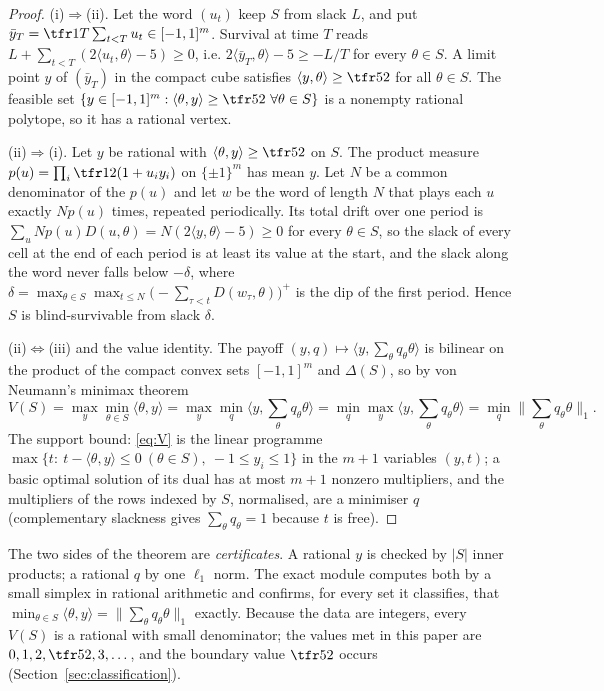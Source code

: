 \begin{proof}
(i)$\Rightarrow$(ii). Let the word $(u_t)$ keep $S$ from slack $L$, and put $\bar y_T=\tfr1T\sum_{t<T}u_t\in[-1,1]^m$. Survival at time $T$ reads $L+\sum_{t<T}(2\langle u_t,\theta\rangle-5)\ge0$, i.e. $2\langle\bar y_T,\theta\rangle-5\ge-L/T$ for every $\theta\in S$. A limit point $y$ of $(\bar y_T)$ in the compact cube satisfies $\langle y,\theta\rangle\ge\tfr52$ for all $\theta\in S$. The feasible set $\{y\in[-1,1]^m:\langle\theta,y\rangle\ge\tfr52\ \forall\theta\in S\}$ is a nonempty rational polytope, so it has a rational vertex.

(ii)$\Rightarrow$(i). Let $y$ be rational with $\langle\theta,y\rangle\ge\tfr52$ on $S$. The product measure $p(u)=\prod_{i}\tfr12(1+u_iy_i)$ on $\{\pm1\}^m$ has mean $y$. Let $N$ be a common denominator of the $p(u)$ and let $w$ be the word of length $N$ that plays each $u$ exactly $Np(u)$ times, repeated periodically. Its total drift over one period is $\sum_uNp(u)D(u,\theta)=N(2\langle y,\theta\rangle-5)\ge0$ for every $\theta\in S$, so the slack of every cell at the end of each period is at least its value at the start, and the slack along the word never falls below $-\delta$, where $\delta=\max_{\theta\in S}\max_{t\le N}\big(-\sum_{\tau<t}D(w_\tau,\theta)\big)^+$ is the dip of the first period. Hence $S$ is blind-survivable from slack $\delta$.

(ii)$\Leftrightarrow$(iii) and the value identity. The payoff $(y,q)\mapsto\langle y,\sum_\theta q_\theta\theta\rangle$ is bilinear on the product of the compact convex sets $[-1,1]^m$ and $\Delta(S)$, so by von Neumann's minimax theorem \cite{vonNeumann1928}
\[V(S)=\max_y\min_{\theta\in S}\langle\theta,y\rangle=\max_y\min_q\Big\langle y,\sum_\theta q_\theta\theta\Big\rangle=\min_q\max_y\Big\langle y,\sum_\theta q_\theta\theta\Big\rangle=\min_q\Big\|\sum_\theta q_\theta\theta\Big\|_1 .\]
The support bound: \eqref{eq:V} is the linear programme $\max\{t:\ t-\langle\theta,y\rangle\le0\ (\theta\in S),\ -1\le y_i\le1\}$ in the $m+1$ variables $(y,t)$; a basic optimal solution of its dual has at most $m+1$ nonzero multipliers, and the multipliers of the rows indexed by $S$, normalised, are a minimiser $q$ (complementary slackness gives $\sum_\theta q_\theta=1$ because $t$ is free).
\end{proof}

The two sides of the theorem are \emph{certificates}. A rational $y$ is checked by $|S|$ inner products; a rational $q$ by one $\ell_1$ norm. The exact module computes both by a small simplex in rational arithmetic and confirms, for every set it classifies, that $\min_{\theta\in S}\langle\theta,y\rangle=\|\sum_\theta q_\theta\theta\|_1$ exactly. Because the data are integers, every $V(S)$ is a rational with small denominator; the values met in this paper are $0,1,2,\tfr52,3,\dots$, and the boundary value $\tfr52$ occurs (Section~\ref{sec:classification}).


